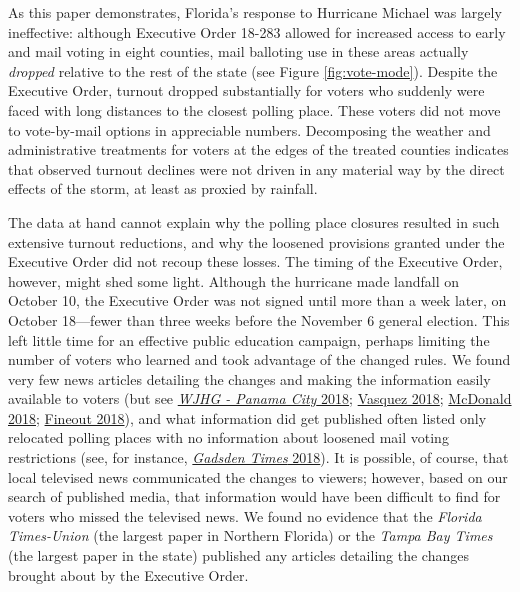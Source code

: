 \documentclass[
  12pt,
]{article}
\begin{document}
As this paper demonstrates, Florida's response to Hurricane Michael was largely ineffective: although Executive Order 18-283 allowed for increased access to early and mail voting in eight counties, mail balloting use in these areas actually \emph{dropped} relative to the rest of the state (see Figure \ref{fig:vote-mode}). Despite the Executive Order, turnout dropped substantially for voters who suddenly were faced with long distances to the closest polling place. These voters did not move to vote-by-mail options in appreciable numbers. Decomposing the weather and administrative treatments for voters at the edges of the treated counties indicates that observed turnout declines were not driven in any material way by the direct effects of the storm, at least as proxied by rainfall.

The data at hand cannot explain why the polling place closures resulted in such extensive turnout reductions, and why the loosened provisions granted under the Executive Order did not recoup these losses. The timing of the Executive Order, however, might shed some light. Although the hurricane made landfall on October 10, the Executive Order was not signed until more than a week later, on October 18---fewer than three weeks before the November 6 general election. This left little time for an effective public education campaign, perhaps limiting the number of voters who learned and took advantage of the changed rules. We found very few news articles detailing the changes and making the information easily available to voters (but see \protect\hyperlink{ref-WJHG2018}{\emph{WJHG - Panama City} 2018}; \protect\hyperlink{ref-Vasquez2018}{Vasquez 2018}; \protect\hyperlink{ref-McDonald2018}{McDonald 2018}; \protect\hyperlink{ref-Fineout2018}{Fineout 2018}), and what information did get published often listed only relocated polling places with no information about loosened mail voting restrictions (see, for instance, \protect\hyperlink{ref-gadsdentimes2018}{\emph{Gadsden Times} 2018}). It is possible, of course, that local televised news communicated the changes to viewers; however, based on our search of published media, that information would have been difficult to find for voters who missed the televised news. We found no evidence that the \emph{Florida Times-Union} (the largest paper in Northern Florida) or the \emph{Tampa Bay Times} (the largest paper in the state) published any articles detailing the changes brought about by the Executive Order.
\end{document}
